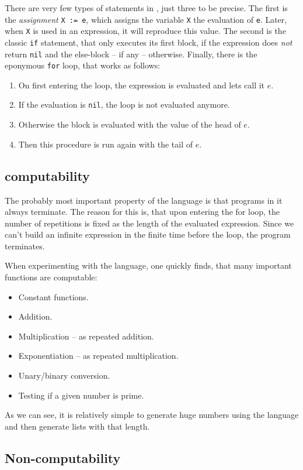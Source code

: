 There are very few types of statements in \FOR, just three to be precise. The 
first is the {\em assignment} {\tt X := e}, which assigns the variable {\tt X}
the evaluation of {\tt e}. Later, when {\tt X} is used in an expression, it 
will reproduce this value. The second is the classic {\tt if} statement, that 
only executes its first block, if the expression does {\em not} return {\tt nil} 
and the else-block -- if any -- otherwise. Finally, there is the eponymous 
{\tt for} loop, that works as follows:

\begin{enumerate}
	\item On first entering the loop, the expression is evaluated and lets call 
		it $e$.
	\item If the evaluation is {\tt nil}, the loop is not evaluated anymore.
	\item Otherwise the block is evaluated with the value of the head of $e$.
	\item Then this procedure is run again with the tail of $e$.
\end{enumerate}

\subsection{\FOR computability}
The probably most important property of the \FOR language is that programs in 
it always terminate. The reason for this is, that upon entering the for loop, 
the number of repetitions is fixed as the length of the evaluated expression. 
Since we can't build an infinite expression in the finite time before the 
loop, the program terminates.

When experimenting with the language, one quickly finds, that many important 
functions are \FOR computable:

\begin{itemize}
	\item Constant functions.
	\item Addition.
	\item Multiplication -- as repeated addition.
	\item Exponentiation -- as repeated multiplication.
	\item Unary/binary conversion.
	\item Testing if a given number is prime.
\end{itemize}

As we can see, it is relatively simple to generate huge numbers using the 
\FOR language and then generate lists with that length.

\subsection{Non-\FOR computability}
